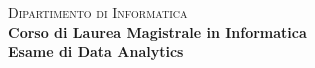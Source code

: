 \documentclass[a4paper, 10pt]{article}
\begin{document}
\begin{titlepage}
\noindent
	\begin{center}
	\begin{minipage}[t]{0.25\textwidth}
	\end{minipage}
	\end{center}
	\hspace{1cm}
	\newline
	
	\begin{center}
	\begin{large}
	      \vspace*{5mm}
		{
			\textsc{Dipartimento di Informatica} \\
			\textbf{Corso di Laurea Magistrale in Informatica}\\
			\textbf{Esame di Data Analytics}\\
			\par
		}
	\end{large}
	\end{center}
	
	\vspace{30mm}

\begin{center}
\begin{Huge}
    {
    
}
\end{Huge}
\end{center}
\end{titlepage}
\end{document}

